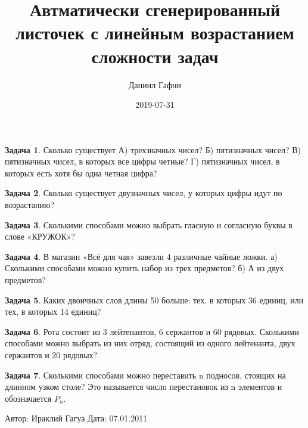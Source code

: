 \documentclass[a4paper,11pt]{article}%
\title{Автматически сгенерированный листочек с линейным возрастанием сложности задач}%
\author{Даниил Гафни}%
\date{2019{-}07{-}31}%
\theoremstyle{definition}%
\newtheorem{Ex}{\hspace{-25pt}\fbox{\phantom{123}} Задача}%
\begin{document}
%
\normalsize%
\maketitle%
\begin{Ex}%
Сколько существует
А) трехзначных чисел?
Б) пятизначных чисел?
В) пятизначных чисел, в которых все цифры четные?
Г) пятизначных чисел, в которых есть хотя бы одна четная цифра?%
%
\end{Ex}%
%
\iffalse%
Автор: Ираклий Гагуа%
Дата: 07.01.2011%
Название: None%
Подсказка: \textbackslash{}\textbackslash{}%
nan%
\fi%
%
\begin{Ex}%
Сколько существует двузначных чисел, у которых цифры идут по возрастанию?%
%
\end{Ex}%
%
\iffalse%
Автор: Ираклий Гагуа%
Дата: 07.01.2011%
Название: None%
Подсказка: \textbackslash{}\textbackslash{}%
nan%
\fi%
%
\begin{Ex}%
Сколькими способами можно выбрать гласную и согласную буквы в слове «КРУЖОК»?%
%
\end{Ex}%
%
\iffalse%
Автор: Ираклий Гагуа%
Дата: 07.01.2011%
Название: None%
Подсказка: \textbackslash{}\textbackslash{}%
nan%
\fi%
%
\begin{Ex}%
В магазин «Всё для чая» завезли 4 различные чайные ложки.
а) Сколькими способами можно купить набор из трех предметов?
б) А из двух предметов?%
%
\end{Ex}%
%
\iffalse%
Автор: Ираклий Гагуа%
Дата: 07.01.2011%
Название: None%
Подсказка: \textbackslash{}\textbackslash{}%
nan%
\fi%
%
\begin{Ex}%
Каких двоичных слов длины 50 больше: тех, в которых 36 единиц, или тех, в которых 14 единиц?%
%
\end{Ex}%
%
\iffalse%
Автор: Ираклий Гагуа%
Дата: 07.01.2011%
Название: None%
Подсказка: \textbackslash{}\textbackslash{}%
nan%
\fi%
%
\begin{Ex}%
Рота состоит из 3 лейтенантов, 6 сержантов и 60 рядовых. Сколькими способами
можно выбрать из них отряд, состоящий из одного лейтенанта, двух сержантов и 20
рядовых?%
%
\end{Ex}%
%
\iffalse%
Автор: 25 школа%
Дата: 01.07.2017%
Название: None%
Подсказка: \textbackslash{}\textbackslash{}%
nan%
\fi%
%
\begin{Ex}%
Сколькими способами можно переставить n подносов, стоящих на длинном узком столе? Это называется число перестановок из n элементов и обозначается $P_n$.%
%
\end{Ex}%
%
\iffalse%
Автор: Ираклий Гагуа%
Дата: 07.01.2011%
\end{document}
